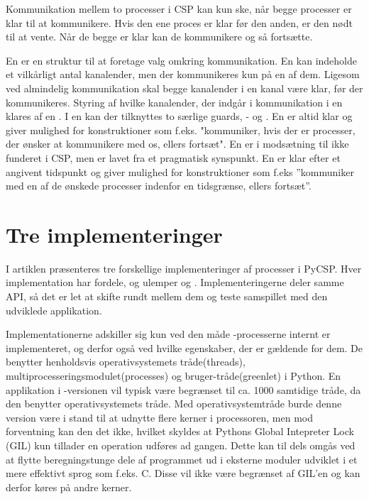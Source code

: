 Kommunikation mellem to processer i CSP kan kun ske, når begge processer er klar til at kommunikere. Hvis den ene proces er klar før den anden, er den nødt til at vente. Når de begge er klar kan de kommunikere og så fortsætte.

En  er en struktur til at foretage valg omkring kommunikation. En  kan indeholde et vilkårligt antal kanalender, men der kommunikeres kun på en af dem. Ligesom ved almindelig kommunikation skal begge kanalender i en kanal være klar, før der kommunikeres. Styring af hvilke kanalender, der indgår i kommunikation i en   klares af en . I en  kan der tilknyttes to særlige guards, - og . En  er altid klar og giver mulighed for konstruktioner som f.eks. "kommuniker, hvis der er processer, der ønsker at kommunikere med os, ellers fortsæt". En  er i modsætning til  ikke funderet i CSP, men er lavet fra et pragmatisk synspunkt. En  er klar efter et angivent tidspunkt og giver mulighed for konstruktioner som f.eks ''kommuniker med en af de ønskede processer indenfor en tidsgrænse, ellers fortsæt''. 

\section{Tre implementeringer}
I artiklen \cite{Friborg2009} præsenteres tre forskellige implementeringer af processer i PyCSP. Hver implementation har fordele, og ulemper og . Implementeringerne deler samme API, så det er let at skifte rundt mellem dem og teste samspillet med den udviklede applikation. 

Implementationerne adskiller sig kun ved den måde \csp-processerne internt er implementeret, og derfor også ved hvilke egenskaber, der er gældende for dem. De benytter henholdsvis operativsystemets tråde(threads), multiprocesseringsmodulet(processes) og bruger-tråde(greenlet) i Python. En applikation i -versionen vil typisk være begrænset til ca. 1000 samtidige tråde, da den benytter operativsystemets tråde\cite[3]{Friborg2009}. Med operativsystemtråde burde denne version  være i stand til at udnytte flere kerner i processoren, men mod forventning kan den det ikke, hvilket skyldes at Pythons Global Intepreter Lock (GIL) kun tillader en operation udføres ad gangen. Dette kan til dels omgås ved at flytte beregningstunge dele af programmet ud i eksterne moduler udviklet i et mere effektivt sprog som f.eks. C. Disse vil ikke være begrænset af GIL'en og kan derfor køres på andre kerner. 

